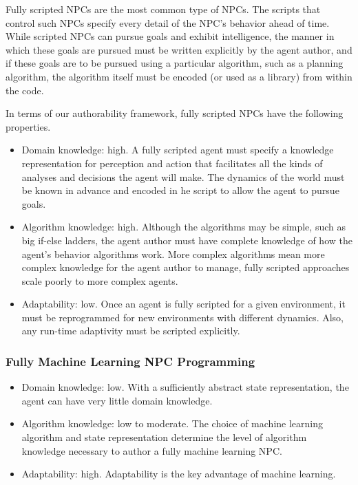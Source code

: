 Fully scripted NPCs are the most common type of NPCs.  The scripts that control such NPCs specify every detail of the NPC's behavior ahead of time.  While scripted NPCs can pursue goals and exhibit intelligence, the manner in which these goals are pursued must be written explicitly by the agent author, and if these goals are to be pursued using a particular algorithm, such as a planning algorithm, the algorithm itself must be encoded (or used as a library) from within the code.

In terms of our authorability framework, fully scripted NPCs have the
following properties.
\begin{itemize}
\item Domain knowledge: high. A fully scripted agent must specify a knowledge representation for perception and action that facilitates all the kinds of analyses and decisions the agent will make.  The dynamics of the world must be known in advance and encoded in he script to allow the agent to pursue goals.
\item Algorithm knowledge: high.  Although the algorithms may be simple, such as big if-else ladders, the agent author must have complete knowledge of how the agent's behavior algorithms work.  More complex algorithms mean more complex knowledge for the agent author to manage, fully scripted approaches scale poorly to more complex agents.
\item Adaptability: low.  Once an agent is fully scripted for a given environment, it must be reprogrammed for new environments with different dynamics.  Also, any run-time adaptivity must be scripted explicitly.
\end{itemize}

\subsubsection{Fully Machine Learning NPC Programming}

\begin{itemize}
\item Domain knowledge: low. With a sufficiently abstract state
  representation, the agent can have very little domain knowledge.
\item Algorithm knowledge: low to moderate.  The choice of machine
  learning algorithm and state representation determine the level of
  algorithm knowledge necessary to author a fully machine learning
  NPC.
\item Adaptability: high.  Adaptability is the key advantage of
  machine learning.
\end{itemize}

